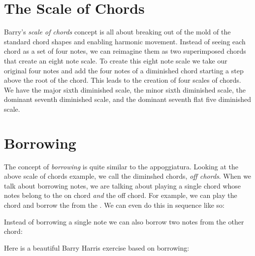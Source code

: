 \section{The Scale of Chords}
Barry's \emph{scale of chords} concept is all about breaking out of the mold of the standard chord shapes and enabling harmonic movement. Instead of seeing each chord as a set of four notes, we can reimagine them as two superimposed chords that create an eight note scale. To create this eight note scale we take our original four notes and add the four notes of a diminished chord starting a step above the root of the chord. This leads to the creation of four scales of chords. We have the major sixth diminished scale, the minor sixth diminished scale, the dominant seventh diminished scale, and the dominant seventh flat five diminished scale.


\section{Borrowing}
The concept of \emph{borrowing} is quite similar to the appoggiatura. Looking at the above scale of chords example, we call the diminshed chords, \emph{off chords}. When we talk about borrowing notes, we are talking about playing a single chord whose notes belong to the on chord \emph{and} the off chord. For example, we can play the  chord and borrow the  from the . We can even do this in sequence like so:


Instead of borrowing a single note we can also borrow two notes from the other chord:


Here is a beautiful Barry Harris exercise based on borrowing:


